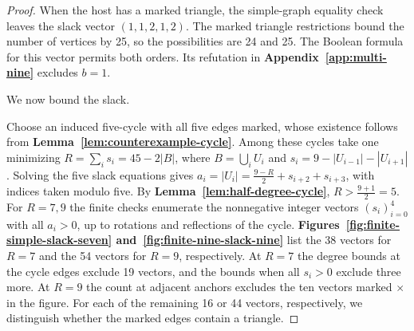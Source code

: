\begin{proof}
When the host has a marked triangle, the simple-graph
equality check leaves the slack vector $(1,1,2,1,2)$.
The marked triangle restrictions bound the number of
vertices by 25, so the possibilities are 24 and 25.
The Boolean formula for this vector permits both orders. Its
refutation in \textbf{Appendix~\ref{app:multi-nine}} excludes $b=1$.

We now bound the slack.

Choose an induced five-cycle with all five edges marked, whose existence follows from
\textbf{Lemma~\ref{lem:counterexample-cycle}}. Among these cycles take one minimizing
$R=\sum_i s_i=45-2|B|$, where $B=\bigcup_i U_i$ and
$s_i=9-|U_{i-1}|-|U_{i+1}|$. Solving the five slack
equations gives $a_i=|U_i|=\frac{9-R}{2}+s_{i+2}+s_{i+3}$,
with indices taken modulo five. By \textbf{Lemma~\ref{lem:half-degree-cycle}},
$R>\frac{9+1}{2}=5$.
For $R=7,9$ the finite checks enumerate the nonnegative
integer vectors $(s_i)_{i=0}^4$ with all $a_i>0$, up to
rotations and reflections of the cycle.
\textbf{Figures~\ref{fig:finite-simple-slack-seven}
and~\ref{fig:finite-nine-slack-nine}} list the 38 vectors for $R=7$
and the 54 vectors for $R=9$, respectively. At $R=7$ the degree
bounds at the cycle edges exclude 19 vectors, and the bounds when
all $s_i>0$ exclude three more. At $R=9$ the count at adjacent
anchors excludes the ten vectors marked $\times$ in the figure.
For each of the remaining 16 or 44 vectors, respectively, we
distinguish whether the marked edges contain a triangle.



\end{proof}
